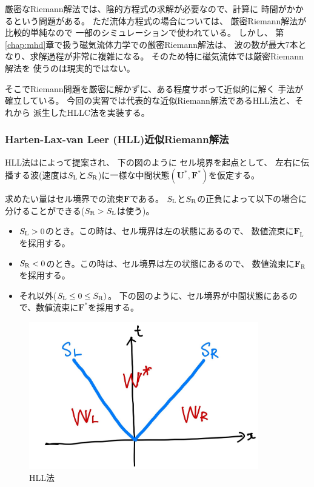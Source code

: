 厳密なRiemann解法では、陰的方程式の求解が必要なので、計算に
時間がかかるという問題がある。
ただ流体方程式の場合については、
厳密Riemann解法が比較的単純なので
一部のシミュレーションで使われている。
しかし、
第\ref{chap:mhd}章で扱う磁気流体力学での厳密Riemann解法は、
波の数が最大7本となり、求解過程が非常に複雑になる。
そのため特に磁気流体では厳密Riemann解法を
使うのは現実的ではない。

そこでRiemann問題を厳密に解かずに、ある程度サボって近似的に解く
手法が確立している。
今回の実習では代表的な近似Riemann解法であるHLL法と、それから
派生したHLLC法を実装する。

\subsubsection{Harten-Lax-van Leer (HLL)近似Riemann解法}



HLL法は\citet{Harten1983}によって提案され、
下の図のように
セル境界を起点として、
左右に伝播する波(速度は$S_\mathrm{L}$と$S_\mathrm{R}$)に一様な中間状態$(\bm{ U}^*,\bm{ F}^*)$を仮定する。

求めたい量はセル境界での流束$\bm{ F}$である。
$S_\mathrm{L}$と$S_\mathrm{R}$の正負によって以下の場合に分けることができる($S_\mathrm{R}>S_\mathrm{L}$は使う)。
\begin{itemize}
\item $S_\mathrm{L}>0$のとき。この時は、セル境界は左の状態にあるので、
数値流束に$\bm{ F}_\mathrm{L
}$を採用する。

\item $S_\mathrm{R} < 0$のとき。この時は、セル境界は左の状態にあるので、
数値流束に$\bm{ F}_\mathrm{R
}$を採用する。

\item それ以外($S_\mathrm{L}\le 0 \le S_\mathrm{R})$。
下の図のように、セル境界が中間状態にあるので、数値流束に$\bm{ F}^*$を採用する。
\end{itemize}


\begin{figure}[htpb]
    \centering
    \includegraphics[width=10cm]{figures/HLL.pdf}
    \caption{
    HLL法
    }
    \label{fig:HLL}
\end{figure}


